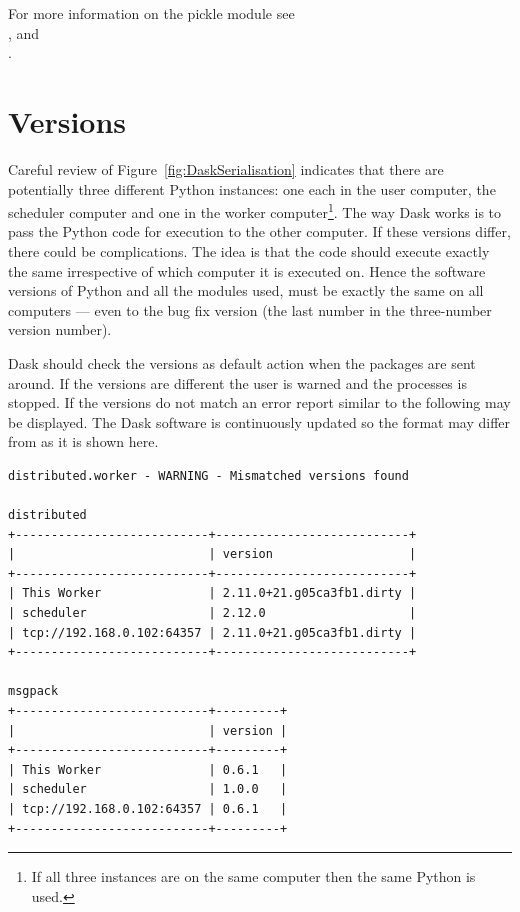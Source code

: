 For more information on the pickle module see \\
, and \\
.


\section{Versions}

Careful review of Figure~\ref{fig:DaskSerialisation} indicates that there are potentially three different Python instances: one each in the user computer, the scheduler computer and one in the worker computer\footnote{If all three instances are on the same computer then the same Python is used.}.  The way Dask works is to pass the Python code for execution to the other computer. If these versions differ, there could be complications.  The idea is that the code should execute exactly the same irrespective of which computer it is executed on. Hence the software versions of Python and all the modules used, must be exactly the same on all computers --- even to the bug fix version (the last number in the three-number version number).

Dask should check the versions as default action when the packages are sent around. If the versions are different the user is warned and the processes is stopped. 
If the versions do not match an error report similar to the following may be displayed. 
The Dask software is continuously updated so the format may differ from as it is shown here.

\begin{lstlisting}
distributed.worker - WARNING - Mismatched versions found

distributed
+---------------------------+---------------------------+
|                           | version                   |
+---------------------------+---------------------------+
| This Worker               | 2.11.0+21.g05ca3fb1.dirty |
| scheduler                 | 2.12.0                    |
| tcp://192.168.0.102:64357 | 2.11.0+21.g05ca3fb1.dirty |
+---------------------------+---------------------------+

msgpack
+---------------------------+---------+
|                           | version |
+---------------------------+---------+
| This Worker               | 0.6.1   |
| scheduler                 | 1.0.0   |
| tcp://192.168.0.102:64357 | 0.6.1   |
+---------------------------+---------+
\end{lstlisting}

